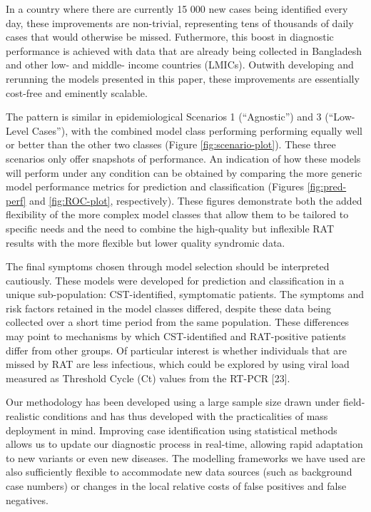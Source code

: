 \documentclass[]{elsarticle} %
\begin{document}
In a country where there are currently 15 000 new cases being identified every day, these improvements are non-trivial, representing tens of thousands of daily cases that would otherwise be missed.
Futhermore, this boost in diagnostic performance is achieved with data that are already being collected in Bangladesh and other low- and middle- income countries (LMICs).
Outwith developing and rerunning the models presented in this paper, these improvements are essentially cost-free and eminently scalable.

The pattern is similar in epidemiological Scenarios 1 (``Agnostic'') and 3 (``Low-Level Cases''), with the combined model class performing performing equally well or better than the other two classes (Figure \ref{fig:scenario-plot}).
These three scenarios only offer snapshots of performance.
An indication of how these models will perform under any condition can be obtained by comparing the more generic model performance metrics for prediction and classification (Figures \ref{fig:pred-perf} and \ref{fig:ROC-plot}, respectively).
These figures demonstrate both the added flexibility of the more complex model classes that allow them to be tailored to specific needs and the need to combine the high-quality but inflexible RAT results with the more flexible but lower quality syndromic data.

The final symptoms chosen through model selection should be interpreted cautiously.
These models were developed for prediction and classification in a unique sub-population: CST-identified, symptomatic patients.
The symptoms and risk factors retained in the model classes differed, despite these data being collected over a short time period from the same population.
These differences may point to mechanisms by which CST-identified and RAT-positive patients differ from other groups.
Of particular interest is whether individuals that are missed by RAT are less infectious, which could be explored by using viral load measured as Threshold Cycle (Ct) values from the RT-PCR {[}23{]}.

Our methodology has been developed using a large sample size drawn under field-realistic conditions and has thus developed with the practicalities of mass deployment in mind.
Improving case identification using statistical methods allows us to update our diagnostic process in real-time, allowing rapid adaptation to new variants or even new diseases.
The modelling frameworks we have used are also sufficiently flexible to accommodate new data sources (such as background case numbers) or changes in the local relative costs of false positives and false negatives.
\end{document}
